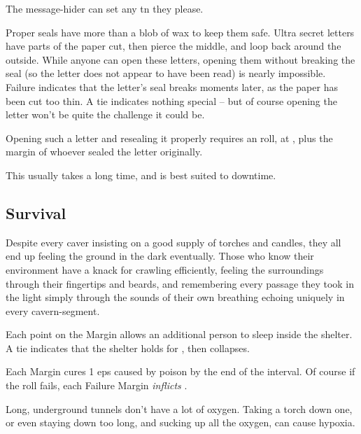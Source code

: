 \begin{multicols}{2}
The message-hider can set any \gls{tn} they please.

Proper seals have more than a blob of wax to keep them safe.
Ultra secret letters have parts of the paper cut, then pierce the middle, and loop back around the outside.
While anyone can open these letters, opening them without breaking the seal (so the letter does not appear to have been read) is nearly impossible.
Failure indicates that the letter's seal breaks moments later, as the paper has been cut too thin.
A tie indicates nothing special -- but of course opening the letter won't be quite the challenge it could be.

Opening such a letter and resealing it properly requires an  roll, at \tn[14], plus the margin of whoever sealed the letter originally.

This usually takes a long time, and is best suited to \gls{downtime}.

\subsection{Survival}

Despite every caver insisting on a good supply of torches and candles, they all end up feeling the ground in the dark eventually.
Those who know their environment have a knack for crawling efficiently, feeling the surroundings through their fingertips and beards, and remembering every passage they took in the light simply through the sounds of their own breathing echoing uniquely in every cavern-segment.

Each point on the Margin allows an additional person to sleep inside the shelter.
A tie indicates that the shelter holds for , then collapses.

Each Margin cures 1 \glspl{ep} caused by poison by the end of the \gls{interval}.
Of course if the roll fails, each Failure Margin \emph{inflicts} .

Long, underground tunnels don't have a lot of oxygen.
Taking a torch down one, or even staying down too long, and sucking up all the oxygen, can cause hypoxia.


\end{multicols}
